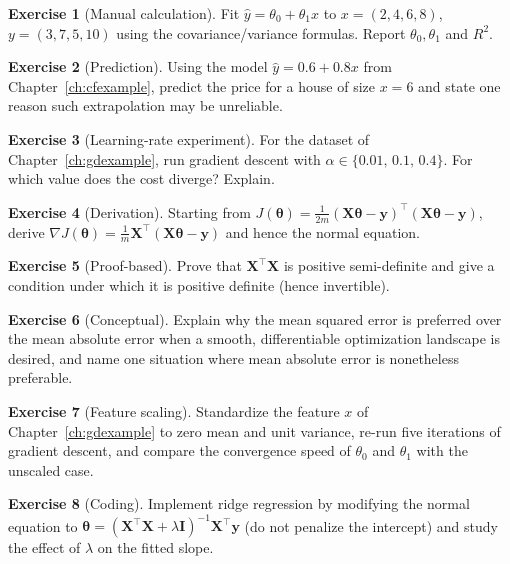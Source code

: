 \documentclass[11pt,a4paper]{report}
\theoremstyle{definition}
\newtheorem{exercise}{Exercise}[chapter]
\theoremstyle{plain}
\theoremstyle{remark}
\newcommand{\vy}{\mathbf{y}}
\newcommand{\vw}{\bm{\theta}}          %
\newcommand{\Xmat}{\mathbf{X}}
\begin{document}
	\begin{exercise}[Manual calculation]
		Fit $\hat y=\theta_0+\theta_1x$ to $x=(2,4,6,8)$, $y=(3,7,5,10)$ using the
		covariance/variance formulas. Report $\theta_0,\theta_1$ and $R^2$.
	\end{exercise}
	
	\begin{exercise}[Prediction]
		Using the model $\hat y=0.6+0.8x$ from Chapter~\ref{ch:cfexample}, predict the
		price for a house of size $x=6$ and state one reason such extrapolation may be
		unreliable.
	\end{exercise}
	
	\begin{exercise}[Learning-rate experiment]
		For the dataset of Chapter~\ref{ch:gdexample}, run gradient descent with
		$\alpha\in\{0.01,\,0.1,\,0.4\}$. For which value does the cost diverge? Explain.
	\end{exercise}
	
	\begin{exercise}[Derivation]
		Starting from $J(\vw)=\frac{1}{2m}(\Xmat\vw-\vy)^{\!\top}(\Xmat\vw-\vy)$, derive
		$\nabla J(\vw)=\frac1m\Xmat^{\!\top}(\Xmat\vw-\vy)$ and hence the normal
		equation.
	\end{exercise}
	
	\begin{exercise}[Proof-based]
		Prove that $\Xmat^{\!\top}\Xmat$ is positive semi-definite and give a condition
		under which it is positive definite (hence invertible).
	\end{exercise}
	
	\begin{exercise}[Conceptual]
		Explain why the mean squared error is preferred over the mean absolute error
		when a smooth, differentiable optimization landscape is desired, and name one
		situation where mean absolute error is nonetheless preferable.
	\end{exercise}
	
	\begin{exercise}[Feature scaling]
		Standardize the feature $x$ of Chapter~\ref{ch:gdexample} to zero mean and unit
		variance, re-run five iterations of gradient descent, and compare the
		convergence speed of $\theta_0$ and $\theta_1$ with the unscaled case.
	\end{exercise}
	
	\begin{exercise}[Coding]
		Implement ridge regression by modifying the normal equation to
		$\vw=(\Xmat^{\!\top}\Xmat+\lambda\mathbf{I})^{-1}\Xmat^{\!\top}\vy$ (do not
		penalize the intercept) and study the effect of $\lambda$ on the fitted slope.
	\end{exercise}
	
\end{document}
